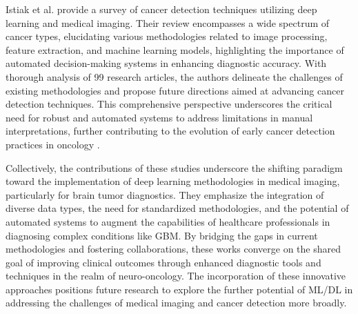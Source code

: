 \documentclass[runningheads]{llncs}
\begin{document}
Istiak et al. provide a survey of cancer detection techniques utilizing deep learning and medical imaging. Their review encompasses a wide spectrum of cancer types, elucidating various methodologies related to image processing, feature extraction, and machine learning models, highlighting the importance of automated decision-making systems in enhancing diagnostic accuracy. With thorough analysis of 99 research articles, the authors delineate the challenges of existing methodologies and propose future directions aimed at advancing cancer detection techniques. This comprehensive perspective underscores the critical need for robust and automated systems to address limitations in manual interpretations, further contributing to the evolution of early cancer detection practices in oncology \cite{Istiak_2024}.

Collectively, the contributions of these studies underscore the shifting paradigm toward the implementation of deep learning methodologies in medical imaging, particularly for brain tumor diagnostics. They emphasize the integration of diverse data types, the need for standardized methodologies, and the potential of automated systems to augment the capabilities of healthcare professionals in diagnosing complex conditions like GBM. By bridging the gaps in current methodologies and fostering collaborations, these works converge on the shared goal of improving clinical outcomes through enhanced diagnostic tools and techniques in the realm of neuro-oncology. The incorporation of these innovative approaches positions future research to explore the further potential of ML/DL in addressing the challenges of medical imaging and cancer detection more broadly.
\end{document}
